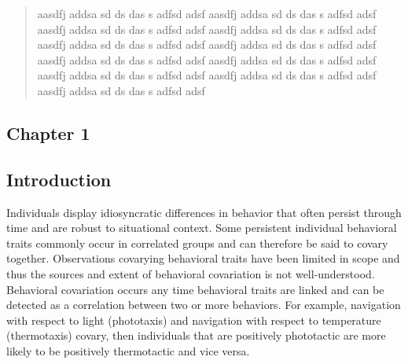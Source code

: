 \documentclass[12pt,letterpaper]{article}
\begin{document}
\setcounter{page}{3}
\begin{abstract}
    aasdfj addsa sd ds das s adfsd adsf aasdfj addsa sd ds das s adfsd adsf aasdfj addsa sd ds das s adfsd adsf aasdfj addsa sd ds das s adfsd adsf aasdfj addsa sd ds das s adfsd adsf aasdfj addsa sd ds das s adfsd adsf aasdfj addsa sd ds das s adfsd adsf aasdfj addsa sd ds das s adfsd adsf aasdfj addsa sd ds das s adfsd adsf aasdfj addsa sd ds das s adfsd adsf aasdfj addsa sd ds das s adfsd adsf 
\end{abstract}

\clearpage
\begin{center}
    \Large\section{Chapter 1}
    \setcounter{page}{1}        %
    \thispagestyle{empty}       %
    \clearpage
\end{center}

\subsection{Introduction}

Individuals display idiosyncratic differences in behavior that often persist through time and are robust to situational context. Some persistent individual behavioral traits commonly occur in correlated groups and can therefore be said to covary together. Observations covarying behavioral traits have been limited in scope and thus the sources and extent of behavioral covariation is not well-understood. Behavioral covariation occurs any time behavioral traits are linked and can be detected as a correlation between two or more behaviors. For example, navigation with respect to light (phototaxis) and navigation with respect to temperature (thermotaxis) covary, then individuals that are positively phototactic are more likely to be positively thermotactic and vice versa. 
\end{document}
